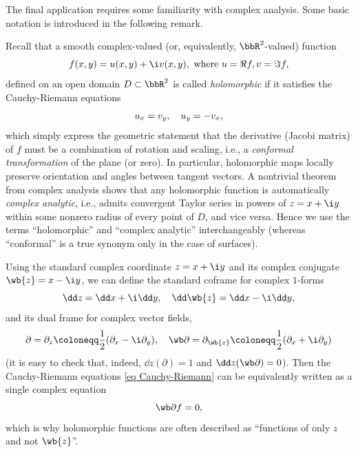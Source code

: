 The final application requires some familiarity with complex analysis. Some basic notation is introduced in the following remark.
\begin{rem}\label{rem holomorphic functions}
    Recall that a smooth complex-valued (or, equivalently, $\bbR^2$-valued) function 
    \[f(x,y)=u(x,y)+\i v(x,y),\text{ where } u=\Re f,v=\Im f,\]
    defined on an open domain $D\subset\bbR^2$ is called \emph{holomorphic} if it satisfies the Cauchy-Riemann equations 
    \[u_x=v_y, \quad u_y=-v_x,\label{eq Cauchy-Riemann}\index{Equation!Cauchy-Riemann}\]
    which simply express the geometric statement that the derivative (Jacobi matrix) of $f$ must be a combination of rotation and scaling, i.e., a \emph{conformal transformation} of the plane (or zero). In particular, holomorphic maps locally preserve orientation and angles between tangent vectors. A nontrivial theorem from complex analysis shows that any holomorphic function is automatically \emph{complex analytic}, i.e., admits convergent Taylor series in powers of $z=x+\i y$ within some nonzero radius of every point of $D$, and vice versa. Hence we use the terms ``holomorphic'' and ``complex analytic'' interchangeably (whereas ``conformal'' is a true synonym only in the case of surfaces).

    Using the standard complex coordinate $z=x+\i y$ and its complex conjugate $\wb{z}=x-\i y$, we can define the standard coframe for complex $1$-forms
    \[\dd z=\dd x+\i \dd y,\quad \dd \wb{z}=\dd x-\i \dd y,\]
    and its dual frame for complex vector fields,
    \[\partial= \partial_z\coloneqq\frac{1}{2}(\partial_x-\i \partial_y),\quad \wb\partial= \partial_{\wb{z}}\coloneqq\frac{1}{2}(\partial_x+\i \partial_y)\]
    (it is easy to check that, indeed, $\dd z(\partial)=1$ and $\dd z(\wb\partial)=0$). Then the Cauchy-Riemann equations \eqref{eq Cauchy-Riemann} can be equivalently written as a single complex equation
    \[\wb\partial f=0,\]
    which is why holomorphic functions are often described as ``functions of only $z$ and not $\wb{z}$''.


\end{rem}

